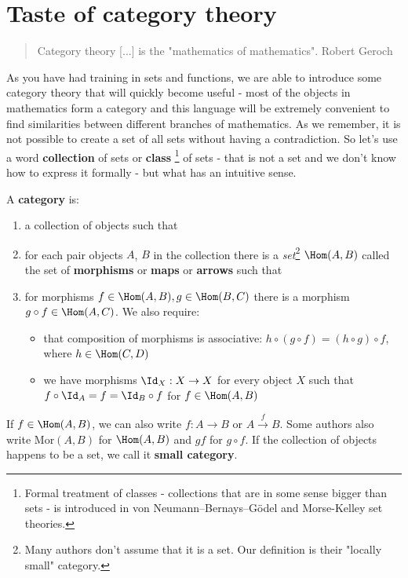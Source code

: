 \chapter{Taste of category theory}

\begin{quote}
  Category theory [...] is the "mathematics of mathematics".
  Robert Geroch
\end{quote}

As you have had training in sets and functions, we are able to introduce some category theory that will quickly become useful - most of the objects in mathematics form a
category and this language will be extremely convenient to find similarities between different branches of mathematics.
As we remember, it is not possible to create a set of all sets without having a contradiction. So let's use a word \textbf{collection} of sets or \textbf{class}
\footnote{Formal treatment of classes - collections that are in some sense bigger than sets - is introduced in von Neumann–Bernays–Gödel and Morse-Kelley set theories.}
 of sets - that is not a set and we don't know how to express it formally - but what has an intuitive sense.

\begin{definition}
  A \textbf{category} is:
  \begin{enumerate}
    \item a collection of objects such that
    \item for each pair objects $A$, $B$ in the collection there is a \emph{set}\footnote{Many authors don't assume that it is a set. Our definition is their "locally small" category.} $\Hom(A,B)$ called the set of \textbf{morphisms} or \textbf{maps} or \textbf{arrows} such that
    \item for morphisms $f\in \Hom(A,B), g\in \Hom(B,C)$ there is a morphism $g\circ f\in \Hom(A,C)$. We also require:
      \begin{itemize}
        \item that composition of morphisms is associative: $h\circ(g\circ f)=(h\circ g)\circ f$, where $h\in \Hom(C, D)$
        \item we have morphisms $\Id_X: X\to X$ for every object $X$ such that $f\circ\Id_A = f=\Id_B\circ f$ for $f\in \Hom(A,B)$
      \end{itemize}
  \end{enumerate}
  If $f\in \Hom(A,B)$, we can also write $f:A\to B$ or $A\xrightarrow{f} B$. Some authors also write $\text{Mor}(A,B)$ for $\Hom(A,B)$ and $gf$ for $g\circ f$. If the collection of objects happens
  to be a set, we call it \textbf{small category}.
\end{definition}

